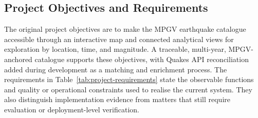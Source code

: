 \documentclass[12pt]{article}
\begin{document}
\subsection{Project Objectives and Requirements}
\label{subsec:project-objectives}

The original project objectives are to make the MPGV earthquake catalogue accessible through an interactive map and connected analytical views for exploration by location, time, and magnitude. A traceable, multi-year, MPGV-anchored catalogue supports these objectives, with Quakes API reconciliation added during development as a matching and enrichment process. The requirements in Table~\ref{tab:project-requirements} state the observable functions and quality or operational constraints used to realise the current system. They also distinguish implementation evidence from matters that still require evaluation or deployment-level verification.
\end{document}
